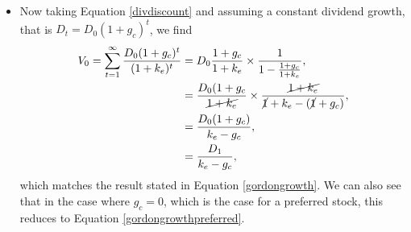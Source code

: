 \documentclass[../notes_compiled.tex]{subfiles}
\begin{document}
\begin{itemize}
\begin{align}
V_{0} = \sum_{t=1}^{\infty} \frac{D_{t}}{(1+k_{p})^{t}} &=\frac{D_{p}}{1+k_{p}} \times \frac{1}{1-\frac{1}{1+k_{p}}}, \nonumber \\
&=\frac{D_{p}}{\cancel{1+k_{p}}}\times\frac{\cancel{1+k_{p}}}{\cancel{1}+k_{p}-\cancel{1}}, \nonumber \\
&=\frac{D_{p}}{k_{p}}. \label{gordongrowthpreferred}
\end{align}
\item Now taking Equation \ref{divdiscount} and assuming a constant dividend growth, that is $D_{t} = D_{0}(1+g_{c})^{t}$, we find
\begin{align}
V_{0} = \sum_{t=1}^{\infty} \frac{D_{0}(1+g_{c})^{t}}{(1+k_{e})^{t}} &=D_{0}\frac{1+g_{c}}{1+k_{e}} \times \frac{1}{1-\frac{1+g_{c}}{1+k_{e}}}, \nonumber \\
&=\frac{D_{0}(1+g_{c}}{\cancel{1+k_{e}}}\times\frac{\cancel{1+k_{e}}}{\cancel{1}+k_{e}-(\cancel{1}+g_{c})}, \nonumber \\
&=\frac{D_{0}(1+g_{c})}{k_{e}-g_{c}}, \nonumber \\
&=\frac{D_{1}}{k_{e}-g_{c}}, \label{gordongrowth2}
\end{align}
which matches the result stated in Equation \ref{gordongrowth}. We can also see that in the case where $g_{c}=0$, which is the case for a preferred stock, this reduces to Equation \ref{gordongrowthpreferred}.

\end{itemize}
\end{document}
